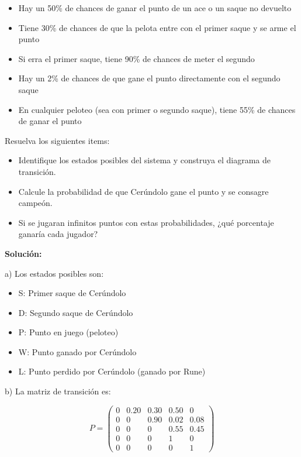 \documentclass[a4paper,11pt]{article}
\begin{document}
\begin{itemize}
    \item Hay un 50\% de chances de ganar el punto de un ace o un saque no devuelto
    \item Tiene 30\% de chances de que la pelota entre con el primer saque y se arme el punto
    \item Si erra el primer saque, tiene 90\% de chances de meter el segundo
    \item Hay un 2\% de chances de que gane el punto directamente con el segundo saque
    \item En cualquier peloteo (sea con primer o segundo saque), tiene 55\% de chances de ganar el punto
\end{itemize}

Resuelva los siguientes items:

\begin{itemize}
    \item[a)] Identifique los estados posibles del sistema y construya el diagrama de transición.
    \item[b)] Calcule la probabilidad de que Cerúndolo gane el punto y se consagre campeón.
    \item[c)] Si se jugaran infinitos puntos con estas probabilidades, ¿qué porcentaje ganaría cada jugador?
\end{itemize}

\textbf{Solución:}

\vspace{0.5em}

a) Los estados posibles son:
\begin{itemize}
    \item S: Primer saque de Cerúndolo
    \item D: Segundo saque de Cerúndolo
    \item P: Punto en juego (peloteo)
    \item W: Punto ganado por Cerúndolo
    \item L: Punto perdido por Cerúndolo (ganado por Rune)
\end{itemize}

\vspace{0.5em}

b) La matriz de transición es:

\[P = \begin{pmatrix}
0 & 0.20 & 0.30 & 0.50 & 0 \\
0 & 0 & 0.90 & 0.02 & 0.08 \\
0 & 0 & 0 & 0.55 & 0.45 \\
0 & 0 & 0 & 1 & 0 \\
0 & 0 & 0 & 0 & 1
\end{pmatrix}\]
\end{document}
